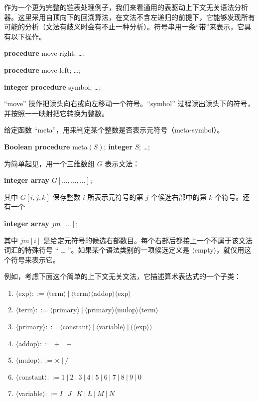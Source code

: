\documentclass[twoside,11pt,fontset=none]{ctexbook}
\begin{document}
作为一个更为完整的链表处理例子，我们来看通用的表驱动上下文无关语法分析器。这里采用自顶向下的回溯算法，在文法不含左递归的前提下，它能够发现所有可能的分析（文法有歧义时会有不止一种分析）。符号串用一条“带”来表示，它具有以下操作。

\quad \textbf{procedure} move right; \dots;

\quad \textbf{procedure} move left; \dots;

\quad \textbf{integer procedure} symbol; \dots;

\noindent
``move'' 操作把读头向右或向左移动一个符号。``symbol'' 过程读出读头下的符号，并按照一一映射把它转换为整数。

给定函数 ``meta''，用来判定某个整数是否表示元符号（meta-symbol）。

\quad \textbf{Boolean procedure} meta$(S)$; \textbf{integer} $S$; \dots;

\noindent
为简单起见，用一个三维数组 $G$ 表示文法：

\quad \textbf{integer array} $G[\dots, \dots, \dots]$;

\noindent
其中 $G[i, j, k]$ 保存整数 $i$ 所表示元符号的第 $j$ 个候选右部中的第 $k$ 个符号。还有一个

\quad \textbf{integer array} $jm[\dots]$;

\noindent
其中 $jm[i]$ 是给定元符号的候选右部数目。每个右部后都接上一个不属于该文法词汇的特殊符号 ``$\perp$''。如果某个语法类别的一项候选定义是 $\langle$empty$\rangle$，就仅用这个符号来表示它。

例如，考虑下面这个简单的上下文无关文法，它描述算术表达式的一个子类：

\begin{enumerate}[wide, nosep, label=(\arabic*)]
	\item $\langle$exp$\rangle ::= \langle$term$\rangle\ |\ \langle$term$\rangle\langle$addop$\rangle\langle$exp$\rangle$
	\item $\langle$term$\rangle ::= \langle$primary$\rangle\ |\ \langle$primary$\rangle\langle$mulop$\rangle\langle$term$\rangle$
	\item $\langle$primary$\rangle ::= \langle$constant$\rangle\ |\ \langle$variable$\rangle\ |\ (\langle$exp$\rangle)$
	\item $\langle$addop$\rangle ::= +\ |\ -$
	\item $\langle$mulop$\rangle ::= \times\ |\ /$
	\item $\langle$constant$\rangle ::= 1\ |\ 2\ |\ 3\ |\ 4\ |\ 5\ |\ 6\ |\ 7\ |\ 8\ |\ 9\ |\ 0$
	\item $\langle$variable$\rangle ::= I\ |\ J\ |\ K\ |\ L\ |\ M\ |\ N$
\end{enumerate}
\end{document}
